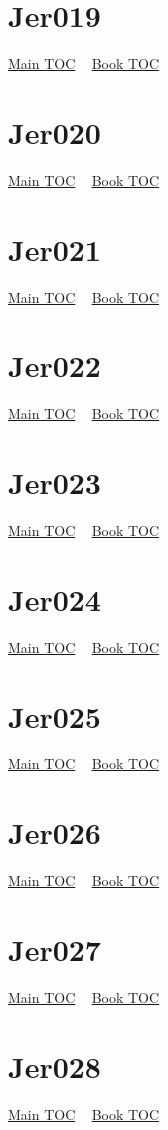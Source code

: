 \documentclass{book}
\begin{document}
  \section{Jer019}\hyperlink{toc}{Main TOC} ~ \hyperref[subsec:Jer]{Book TOC} 
  \section{Jer020}\hyperlink{toc}{Main TOC} ~ \hyperref[subsec:Jer]{Book TOC} 
  \section{Jer021}\hyperlink{toc}{Main TOC} ~ \hyperref[subsec:Jer]{Book TOC} 
  \section{Jer022}\hyperlink{toc}{Main TOC} ~ \hyperref[subsec:Jer]{Book TOC} 
  \section{Jer023}\hyperlink{toc}{Main TOC} ~ \hyperref[subsec:Jer]{Book TOC} 
  \section{Jer024}\hyperlink{toc}{Main TOC} ~ \hyperref[subsec:Jer]{Book TOC} 
  \section{Jer025}\hyperlink{toc}{Main TOC} ~ \hyperref[subsec:Jer]{Book TOC} 
  \section{Jer026}\hyperlink{toc}{Main TOC} ~ \hyperref[subsec:Jer]{Book TOC} 
  \section{Jer027}\hyperlink{toc}{Main TOC} ~ \hyperref[subsec:Jer]{Book TOC} 
  \section{Jer028}\hyperlink{toc}{Main TOC} ~ \hyperref[subsec:Jer]{Book TOC} 
\end{document}
